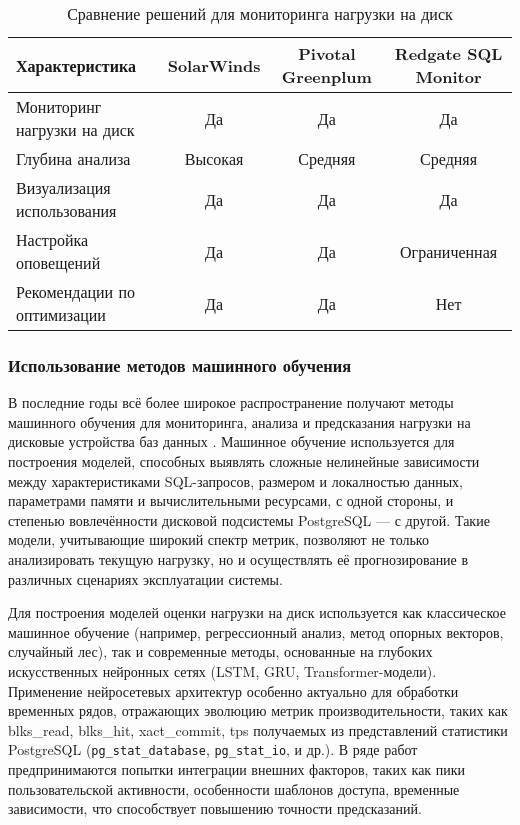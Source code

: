 \begin{table}[H]
    \centering
    \caption{Сравнение решений для мониторинга нагрузки на диск}
    \small %
    \setlength{\tabcolsep}{4pt} %
    \renewcommand{\arraystretch}{1.2} %
    \begin{tabular}{|p{5cm}|c|c|c|}
        \hline
        \textbf{Характеристика} & \textbf{SolarWinds} & \textbf{Pivotal Greenplum} & \textbf{Redgate SQL Monitor} \\ 
        \hline
        Мониторинг нагрузки на диск & Да & Да & Да \\ 
        \hline
        Глубина анализа & Высокая & Средняя & Средняя \\ 
        \hline
        Визуализация использования & Да & Да & Да \\ 
        \hline
        Настройка оповещений & Да & Да & Ограниченная \\ 
        \hline
        Рекомендации по оптимизации & Да & Да & Нет \\ 
        \hline
    \end{tabular}
    \label{tab:disk_monitoring}
\end{table}
\subsubsection{Использование методов машинного обучения}

В последние годы всё более широкое распространение получают методы машинного обучения для мониторинга, 
анализа и предсказания нагрузки на дисковые устройства баз данных \cite{zaghloul2024correction, chen2019machine, sun2023predictive}. 
Машинное обучение используется для построения моделей, способных выявлять сложные нелинейные зависимости между характеристиками 
SQL-запросов, размером и локалностью данных, параметрами памяти и вычислительными ресурсами, с одной стороны, 
и степенью вовлечённости дисковой подсистемы PostgreSQL — с другой. \cite{cheng2025rlstorage} Такие модели, учитывающие широкий спектр метрик, 
позволяют не только анализировать текущую нагрузку, но и осуществлять её прогнозирование в различных сценариях эксплуатации системы.

Для построения моделей оценки нагрузки на диск используется как классическое машинное обучение (например, регрессионный анализ, метод опорных векторов, случайный лес),
так и современные методы, основанные на глубоких искусственных нейронных сетях (LSTM, GRU, Transformer-модели). 
Применение нейросетевых архитектур особенно актуально для обработки временных рядов, отражающих эволюцию метрик производительности, 
таких как blks\_read, blks\_hit, xact\_commit, tps получаемых из представлений статистики PostgreSQL (\texttt{pg\_stat\_database}, 
\texttt{pg\_stat\_io}, и др.). В ряде работ предпринимаются попытки интеграции внешних факторов, таких как пики пользовательской активности, 
особенности шаблонов доступа, временные зависимости, что способствует повышению точности предсказаний\cite{sun2023predictive}.

